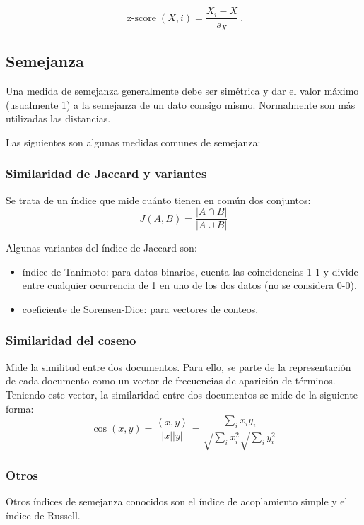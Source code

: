 \documentclass[a4paper,11pt,spanish]{report}
\let\stdsub\subsection
\let\stdsubsub\subsubsection
\renewcommand{\section}{\stdsub}
\renewcommand{\subsection}{\stdsubsub}
\begin{document}
$$\operatorname{z-score}(X, i) = \frac{X_i - \overline X}{s_X}~.$$

\section{Semejanza}
\label{sec-1-2-2}

Una medida de semejanza generalmente debe ser simétrica y dar el valor máximo (usualmente 1) a la semejanza de un dato consigo mismo. Normalmente son más utilizadas las distancias.

Las siguientes son algunas medidas comunes de semejanza:

\subsection*{Similaridad de Jaccard y variantes}
\label{sec-1-2-2-1}

Se trata de un índice que mide cuánto tienen en común dos conjuntos:
$$J(A,B) = \frac{\lvert A\cap B\rvert}{\lvert A\cup B\rvert}$$


Algunas variantes del índice de Jaccard son:
\begin{itemize}
\item índice de Tanimoto: para datos binarios, cuenta las coincidencias 1-1 y divide entre cualquier ocurrencia de 1 en uno de los dos datos (no se considera 0-0).
\item coeficiente de Sorensen-Dice: para vectores de conteos.
\end{itemize}

\subsection*{Similaridad del coseno}
\label{sec-1-2-2-2}

Mide la similitud entre dos documentos. Para ello, se parte de la representación de cada documento como un vector de frecuencias de aparición de términos. Teniendo este vector, la similaridad entre dos documentos se mide de la siguiente forma:
$$\cos(x,y)=\frac{\left<x,y\right>}{\lvert x\rvert\lvert y\rvert}=\frac{\sum_i x_iy_i}{\sqrt{\sum_i x_i^2} \sqrt{\sum_i y_i^2}}$$

\subsection*{Otros}
\label{sec-1-2-2-3}

Otros índices de semejanza conocidos son el índice de acoplamiento simple y el índice de Russell.
\end{document}
